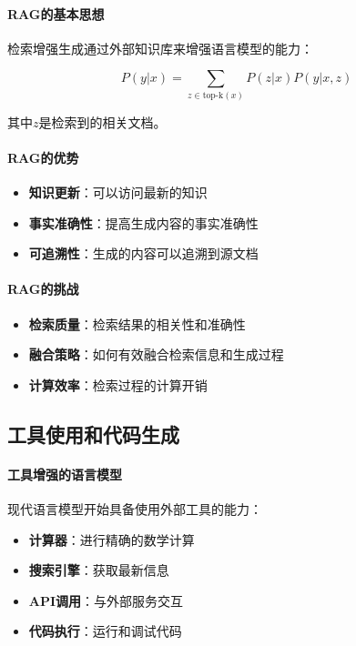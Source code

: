 \paragraph{RAG的基本思想}
检索增强生成通过外部知识库来增强语言模型的能力：

$$P(y|x) = \sum_{z \in \text{top-k}(x)} P(z|x) P(y|x,z)$$

其中$z$是检索到的相关文档。

\paragraph{RAG的优势}
\begin{itemize}
\item \textbf{知识更新}：可以访问最新的知识
\item \textbf{事实准确性}：提高生成内容的事实准确性
\item \textbf{可追溯性}：生成的内容可以追溯到源文档
\end{itemize}

\paragraph{RAG的挑战}
\begin{itemize}
\item \textbf{检索质量}：检索结果的相关性和准确性
\item \textbf{融合策略}：如何有效融合检索信息和生成过程
\item \textbf{计算效率}：检索过程的计算开销
\end{itemize}

\subsection{工具使用和代码生成}

\paragraph{工具增强的语言模型}
现代语言模型开始具备使用外部工具的能力：

\begin{itemize}
\item \textbf{计算器}：进行精确的数学计算
\item \textbf{搜索引擎}：获取最新信息
\item \textbf{API调用}：与外部服务交互
\item \textbf{代码执行}：运行和调试代码
\end{itemize}

